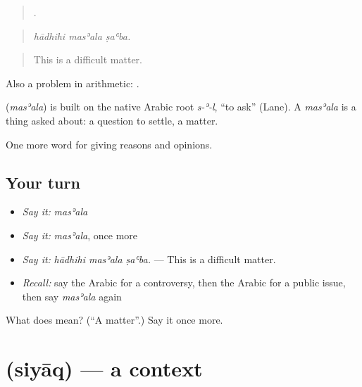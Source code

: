 \begin{quote}
  .
\end{quote}

\begin{quote}
\emph{hādhihi masʾala ṣaʿba.}
\end{quote}

\begin{quote}
This is a difficult matter.
\end{quote}

Also a problem in arithmetic:  .

\begin{cousinweb}
\textbf{} (\emph{masʾala}) is built on the native Arabic root \emph{s-ʾ-l}, \textquotedblleft{}to ask\textquotedblright{} (Lane). A \emph{masʾala} is a thing asked about: a question to settle, a matter.
\end{cousinweb}

\begin{grammarlens}[title={What you've built}]
One more word for giving reasons and opinions.
\end{grammarlens}

\subsection*{Your turn}
\begin{itemize}
\raggedright
  \item \emph{Say it:} \emph{masʾala}
  \item \emph{Say it:} \emph{masʾala}, once more
  \item \emph{Say it:} \emph{hādhihi masʾala ṣaʿba.} — This is a difficult matter.
  \item \emph{Recall:} say the Arabic for a controversy, then the Arabic for a public issue, then say \emph{masʾala} again
\end{itemize}

\begin{tcolorbox}[breakable,colback=teal!4,colframe=teal!35!black,title={Before you move on}]
What does  mean? (\textquotedblleft{}A matter\textquotedblright{}.) Say it once more.
\end{tcolorbox}
\section[\texorpdfstring{\ar{سياق} (siyāq)}{سياق (siyāq)}]{ (siyāq) — a context}

